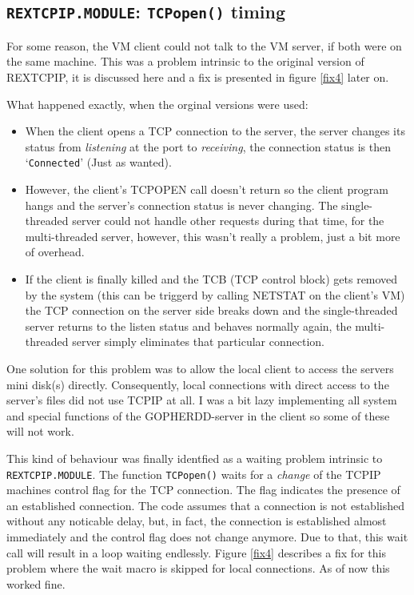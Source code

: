 \subsection{{\tt REXTCPIP.MODULE}: {\tt TCPopen()} timing}

    For some reason, the VM client could not talk to the VM server, if
    both were on the same machine.  This was a problem intrinsic to the
    original version of REXTCPIP, it is discussed here and a fix is
    presented in figure \ref{fix4} later on.

    What happened exactly, when the orginal versions were used:
\begin{itemize}
\item When the client opens a TCP connection to the server, the server
      changes its status from {\sl listening} at the port to 
      {\sl receiving},
      the connection status is then `{\tt Connected}' (Just as wanted).
\item However, the client's TCPOPEN call doesn't return so the
      client program hangs and the server's connection status is
      never changing.
      The single-threaded server could not handle other requests
      during that time, for the multi-threaded server, however,
      this wasn't really a problem, just a bit more of overhead.
\item If the client is finally killed and the TCB (TCP control block)
      gets removed
      by the system (this can be triggerd by calling NETSTAT on the
      client's VM) the TCP connection on the server side breaks down
      and the single-threaded server returns to the listen status and
      behaves normally again, the multi-threaded server simply eliminates
      that particular connection.
\end{itemize}
    One solution for
    this problem was to allow the local client to access the
    servers mini disk(s) directly.  Consequently, local connections
    with direct access to the server's files
    did not use TCPIP at all.  I was a bit lazy implementing all
    system and special functions of the GOPHERDD-server in the client
    so some of these will not work.

This kind of behaviour was finally identfied as a waiting problem 
intrinsic to
    {\tt REXTCPIP.MODULE}.  The function {\tt TCPopen()} waits for a
    {\em change} of the TCPIP machines control flag for the TCP connection.
    The flag indicates the presence of an established connection.
    The code assumes that a connection is not established without any
    noticable delay, but, in fact, the connection is established almost
    immediately and the control flag does not change anymore.  Due to that,
    this wait call will result in a loop waiting endlessly.
    Figure \ref{fix4} describes a fix for this problem where the wait
    macro is skipped for local connections.  As of now this worked fine.



